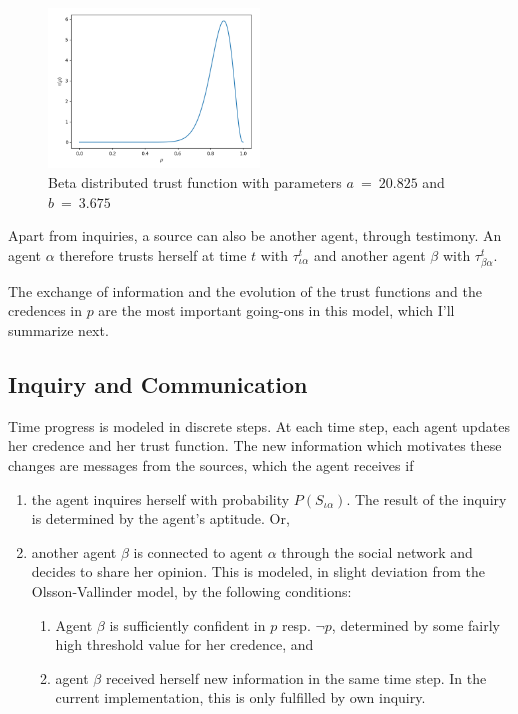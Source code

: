 \documentclass[11pt, a4paper]{article}
\begin{document}
\begin{figure}[ht]
	\centering
    \includegraphics[width=0.5\textwidth]{Figure_1.png}
	\caption{Beta distributed trust function with parameters $a~=~20.825$ and $b~=~3.675$\label{fig:trf}}
\end{figure}

Apart from inquiries, a source can also be another agent, through testimony. An agent $\alpha$ therefore trusts herself at time $t$ with $\tau^t_{\iota\alpha}$ and another agent $\beta$ with $\tau^t_{\beta\alpha}$.

The exchange of information and the evolution of the trust functions and the credences in $p$ are the most important going-ons in this model, which I'll summarize next.

\subsection{Inquiry and Communication} 

Time progress is modeled in discrete steps. At each time step, each agent updates her credence and her trust function. The new information which motivates these changes are messages from the sources, which the agent receives if
\begin{enumerate}[label = (\roman*)]
    \item the agent inquires herself with probability $P(S_{\iota\alpha})$. The result of the inquiry is determined by the agent's aptitude. Or,
    \item another agent $\beta$ is connected to agent $\alpha$ through the social network and decides to share her opinion. This is modeled, in slight deviation from the Olsson-Vallinder model, by the following conditions: 
        \begin{enumerate}[label = (\alph*)]
            \item Agent $\beta$ is sufficiently confident in $p$ resp. $\neg p$, determined by some fairly high threshold value for her credence, and
            \item agent $\beta$ received herself new information in the same time step. In the current implementation, this is only fulfilled by own inquiry.  
        \end{enumerate}
\end{enumerate}
\end{document}
